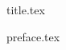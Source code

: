 \documentclass[a4paper,10pt,twoside,twocolumn,openany]{book}
\begin{document}
  \frontmatter
  {title.tex}


  {preface.tex}

  {
    \renewcommand{\cleardoublepage}{\newpage}
    \mainmatter
  }

\end{document}
